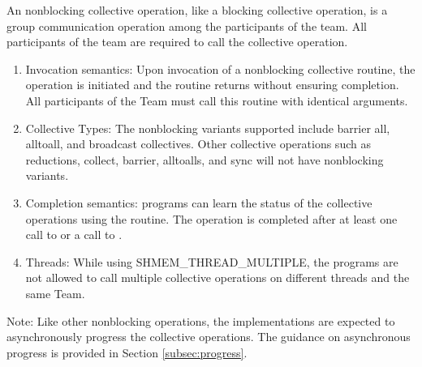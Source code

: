 An \openshmem nonblocking collective operation, like a blocking collective
operation, is a group communication operation among the
participants of the team. All participants of the team are required to call the
collective operation.

\begin{enumerate}

\item Invocation semantics: Upon invocation of a nonblocking collective routine,
the operation is initiated and the routine returns without ensuring completion. All participants of the Team
must call this routine with identical arguments.

\item Collective Types: The nonblocking variants supported include barrier all, alltoall,
and broadcast collectives. Other collective operations such as
reductions, collect, barrier, alltoalls, and sync will not have nonblocking variants.

\item Completion semantics:  \openshmem programs can learn the status of the collective operations
using the  routine. The operation is completed after
at least one call to  or a call to .

\item Threads: While using SHMEM\_THREAD\_MULTIPLE, the \openshmem
programs are not allowed to call multiple collective operations on different threads
and the same Team.

\end{enumerate}

Note: Like other nonblocking \openshmem operations, the implementations are
expected to asynchronously progress the collective operations. The guidance on
asynchronous progress is provided in Section \ref{subsec:progress}.
